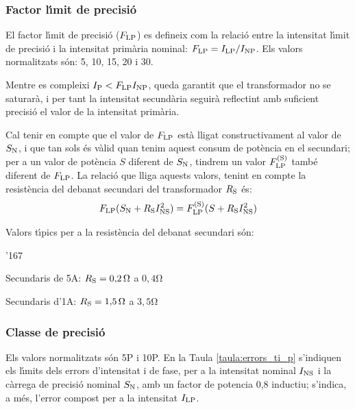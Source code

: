 \subsubsection{Factor l\'{\i}mit de precisi\'{o}}

 El factor l\'{\i}mit de precisi\'{o}
($F_\mathrm{LP}$) es defineix com la relaci\'{o} entre la intensitat l\'{\i}mit de precisi\'{o}
i la intensitat prim\`{a}ria nominal: $F_\mathrm{LP} = I_\mathrm{LP} /I_\mathrm{NP}$.
Els valors normalitzats s\'{o}n: 5, 10, 15, 20 i 30.

Mentre es compleixi  $I_\mathrm{P}<F_\mathrm{LP} I_\mathrm{NP}$, queda garantit
que el transformador no se saturar\`{a}, i per tant la intensitat
secund\`{a}ria seguir\`{a} reflectint amb suficient precisi\'{o} el valor de la
intensitat prim\`{a}ria.

Cal tenir en compte que el valor de $F_\mathrm{LP}$ est\`{a} lligat
constructivament al valor de $S_\mathrm{N}$, i que tan sols \'{e}s v\`{a}lid
quan tenim aquest consum de  pot\`{e}ncia en el secundari; per a un
valor de pot\`{e}ncia $S$ diferent de $S_\mathrm{N}$, tindrem un valor
$F_\mathrm{LP}^\mathrm{(S)}$ tamb\'{e} diferent de  $F_\mathrm{LP}$. La relaci\'{o} que
lliga aquests valors, tenint en compte la resist\`{e}ncia del debanat
secundari del transformador  $R_\mathrm{S}$ \'{e}s:
\begin{equation}\label{eq:flp}
    F_\mathrm{LP} (S_\mathrm{N}+R_\mathrm{S}I_\mathrm{NS}^2) =
    F_\mathrm{LP}^\mathrm{(S)} (S+R_\mathrm{S}I_\mathrm{NS}^2)
\end{equation}

Valors t\'{\i}pics per a la resist\`{e}ncia del debanat secundari s\'{o}n:
\begin{dinglist}{'167}
    \item Secundaris de 5\unit{A}: $R_\mathrm{S} = 0{,}2\mathrm{\,\mathrm{\Omega}}$ a $0{,}4\unit{\ohm}$
    \item Secundaris d'1\unit{A}:  $R_\mathrm{S} = 1{,}5\mathrm{\,\mathrm{\Omega}}$ a $3{,}5\unit{\ohm}$
\end{dinglist}

\subsubsection{Classe de precisi\'{o}}

 Els valors normalitzats s\'{o}n 5P i 10P.
En la Taula \vref{taula:errors_ti_p} s'indiquen els l\'{\i}mits dels
errors d'intensitat i de fase,  per a la intensitat nominal
$I_\mathrm{NS}$ i  la c\`{a}rrega de precisi\'{o} nominal $S_\mathrm{N}$,  amb un
factor de potencia 0,8 inductiu; s'indica, a m\'{e}s, l'error
compost per a la intensitat $I_\mathrm{LP}$.


